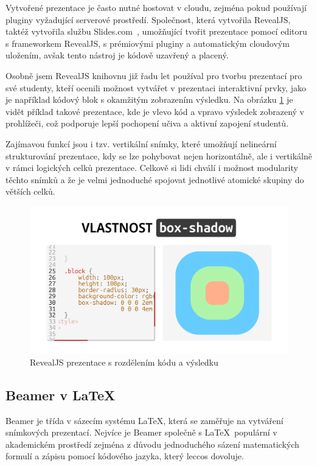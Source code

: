 Vytvořené prezentace je často nutné hostovat v cloudu, zejména pokud používají pluginy vyžadující serverové prostředí.
Společnost, která vytvořila RevealJS, taktéž vytvořila službu Slides.com~\cite{revealjs, slidescom}, umožňující tvořit prezentace pomocí editoru s frameworkem RevealJS, s prémiovými pluginy a automatickým cloudovým uložením, avšak tento nástroj je kódově uzavřený a placený. 

Osobně jsem RevealJS knihovnu již řadu let používal pro tvorbu prezentací pro své studenty, kteří ocenili možnost vytvářet v prezentaci interaktivní prvky, jako je například kódový blok s okamžitým zobrazením výsledku. 
Na obrázku \ref{fig:analyza:revealjs-ukazka} je vidět příklad takové prezentace, kde je vlevo kód a vpravo výsledek zobrazený v prohlížeči, což podporuje lepší pochopení učiva a aktivní zapojení studentů. 

Zajímavou funkcí jsou i tzv. vertikální snímky, které umožňují nelineární strukturování prezentace, kdy se lze pohybovat nejen horizontálně, ale i vertikálně v rámci logických celků prezentace.
Celkově si lidi chválí i možnost modularity těchto snímků a že je velmi jednoduché spojovat jednotlivé atomické skupiny do větších celků.


\begin{figure}[h!]
    \centering
    \includegraphics[width=0.9\linewidth]{media/03_analyza/revealjs.png}
    \caption{RevealJS prezentace s rozdělením kódu a výsledku}
    \label{fig:analyza:revealjs-ukazka}
\end{figure}

\subsection{Beamer v \LaTeX}

Beamer je třída v sázecím systému \LaTeX, která se zaměřuje na vytváření snímkových prezentací.
Nejvíce je Beamer společně s \LaTeX~populární v akademickém prostředí zejména z důvodu jednoduchého sázení matematických formulí a zápisu pomocí kódového jazyka, který leccos dovoluje. 

